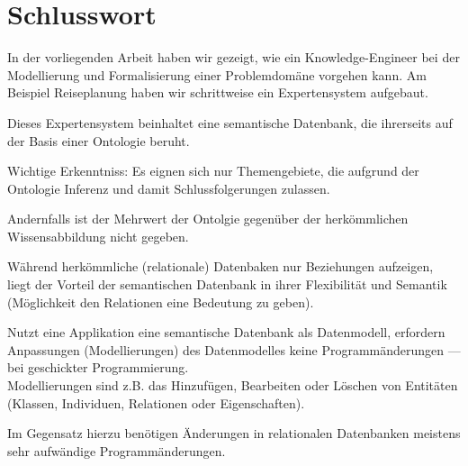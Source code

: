 \chapter{Schlusswort}
\label{chap:schlusswort}

In der vorliegenden Arbeit haben wir gezeigt, wie ein Knowledge-Engineer bei der Modellierung und Formalisierung einer Problemdomäne vorgehen kann. Am Beispiel Reiseplanung haben wir schrittweise ein Expertensystem aufgebaut.


Dieses Expertensystem beinhaltet eine semantische Datenbank, die ihrerseits auf der Basis einer Ontologie beruht.

Wichtige Erkenntniss: Es eignen sich nur Themengebiete, die aufgrund der Ontologie Inferenz und damit Schlussfolgerungen zulassen.

Andernfalls ist der Mehrwert der Ontolgie gegenüber der herkömmlichen Wissensabbildung nicht gegeben.

Während herkömmliche (relationale) Datenbaken nur Beziehungen aufzeigen, liegt der Vorteil der semantischen Datenbank in ihrer Flexibilität und Semantik (Möglichkeit den Relationen eine Bedeutung zu geben).

Nutzt eine Applikation eine semantische Datenbank als Datenmodell, erfordern Anpassungen (Modellierungen) des Datenmodelles keine Programmänderungen --- bei geschickter Programmierung.\\
Modellierungen sind z.B. das Hinzufügen, Bearbeiten oder Löschen von Entitäten (Klassen, Individuen, Relationen oder Eigenschaften).

Im Gegensatz hierzu benötigen Änderungen in relationalen Datenbanken meistens sehr aufwändige Programmänderungen.
